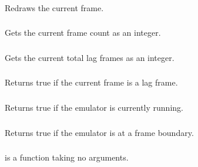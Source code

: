 \documentclass[letterpaper,10pt,english]{sphinxmanual}
\begin{document}
\subsubsection{}
\label{\detokenize{mods:emu-redraw}}\label{\detokenize{mods:redraw}}
\sphinxAtStartPar
Redraws the current frame.


\subsubsection{}
\label{\detokenize{mods:emu-getframecount}}\label{\detokenize{mods:getframecount}}
\sphinxAtStartPar
Gets the current frame count as an integer.


\subsubsection{}
\label{\detokenize{mods:emu-getlagcount}}\label{\detokenize{mods:getlagcount}}
\sphinxAtStartPar
Gets the current total lag frames as an integer.


\subsubsection{}
\label{\detokenize{mods:emu-lagged}}\label{\detokenize{mods:lagged}}
\sphinxAtStartPar
Returns true if the current frame is a lag frame.


\subsubsection{}
\label{\detokenize{mods:emu-emulating}}\label{\detokenize{mods:emulating}}
\sphinxAtStartPar
Returns true if the emulator is currently running.


\subsubsection{}
\label{\detokenize{mods:emu-atframeboundary}}\label{\detokenize{mods:atframeboundary}}
\sphinxAtStartPar
Returns true if the emulator is at a frame boundary.


\subsubsection{}
\label{\detokenize{mods:emu-registerbefore-func}}\label{\detokenize{mods:registerbefore}}
\sphinxAtStartPar
{} is a function taking no arguments.
\end{document}
